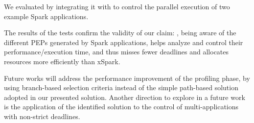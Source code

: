 We evaluated  \dSymb by integrating it with \cSpark to control the parallel execution of two example Spark applications. 



The results of the tests confirm the validity of our claim: \tool, being aware of the different PEPs generated by Spark applications, helps analyze and control their performance/execution time, and thus misses fewer deadlines and allocates resources more efficiently than xSpark.

Future works will address the performance improvement of the profiling phase, by using branch-based selection criteria instead of the simple path-based solution adopted in our presented solution. Another direction to explore in a future work is the application of the identified solution to the control of multi-\plan applications with non-strict deadlines.

